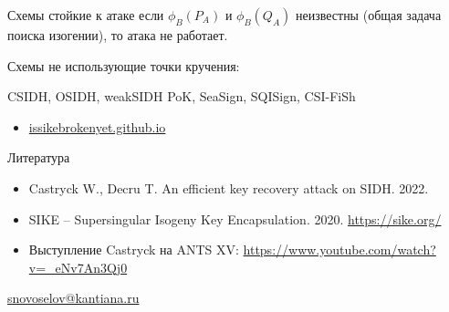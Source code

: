 \documentclass{beamer}
\begin{document}
\begin{frame}{Схемы стойкие к атаке}
	 если $\phi_B(P_A)$ и $\phi_B(Q_A)$ неизвестны (общая задача поиска изогении), то атака не работает.
	
	\vspace{1em}
	Схемы не использующие точки кручения:
	\vspace*{1em}
	
	CSIDH, OSIDH, weakSIDH PoK, SeaSign, SQISign, CSI-FiSh
	\vspace*{1em}
	\begin{itemize}
		\item[\structure{{\faGlobe}}] \href{https://issikebrokenyet.github.io/}{issikebrokenyet.github.io}
	\end{itemize}
\end{frame}

\begin{frame}{Литература}
	\begin{itemize}
		\item[\structure{{\faScroll}}] Castryck W., Decru T. An efficient key recovery attack
		on SIDH. 2022.
		\vspace{0.5em}
		
		\item[\structure{{\faGlobe}}] SIKE – Supersingular Isogeny Key Encapsulation. 2020. \url{https://sike.org/}
		\vspace{0.5em}
		
		\item[\structure{{\faYoutube}}]
		Выступление Castryck на ANTS XV:
		\url{https://www.youtube.com/watch?v=_eNv7An3Qj0}
	\end{itemize}

    \begin{center}
        \begin{tcolorbox}[enhanced,hbox,colback=block-green-color-bg,colframe=subsection-color!120,title=Контакты,center title]
            \begin{varwidth}{\textwidth}
                \begin{center}
                    \href{mailto:snovoselov@kantiana.ru}{snovoselov@kantiana.ru}
                \end{center}
            \end{varwidth}
        \end{tcolorbox}
    \end{center}\end{frame}
\end{document}

